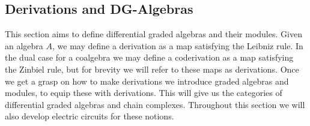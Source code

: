 \documentclass[../thesis.tex]{subfiles}
\begin{document}
    \subsection{Derivations and DG-Algebras}
            This section aims to define differential graded algebras and their modules. Given an algebra $A$, we may define a derivation as a map satisfying the Leibniz rule. In the dual case for a coalgebra we may define a coderivation as a map satisfying the Zinbiel rule, but for brevity we will refer to these maps as derivations. Once we get a grasp on how to make derivations we introduce graded algebras and modules, to equip these with derivations. This will give us the categories of differential graded algebras and chain complexes. Throughout this section we will also develop electric circuits for these notions.
\end{document}
